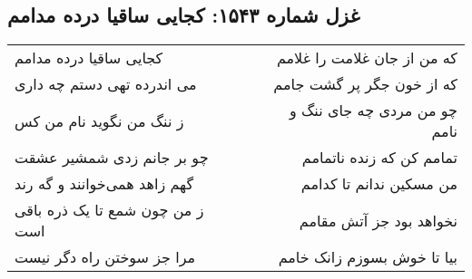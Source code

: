 \begin{center}
\section*{غزل شماره ۱۵۴۳: کجایی ساقیا درده مدامم}
\label{sec:1543}
\begin{longtable}{l p{0.5cm} r}
کجایی ساقیا درده مدامم
&&
که من از جان غلامت را غلامم
\\
می اندرده تهی دستم چه داری
&&
که از خون جگر پر گشت جامم
\\
ز ننگ من نگوید نام من کس
&&
چو من مردی چه جای ننگ و نامم
\\
چو بر جانم زدی شمشیر عشقت
&&
تمامم کن که زنده ناتمامم
\\
گهم زاهد همی‌خوانند و گه رند
&&
من مسکین ندانم تا کدامم
\\
ز من چون شمع تا یک ذره باقی است
&&
نخواهد بود جز آتش مقامم
\\
مرا جز سوختن راه دگر نیست
&&
بیا تا خوش بسوزم زانک خامم
\\
\end{longtable}
\end{center}

